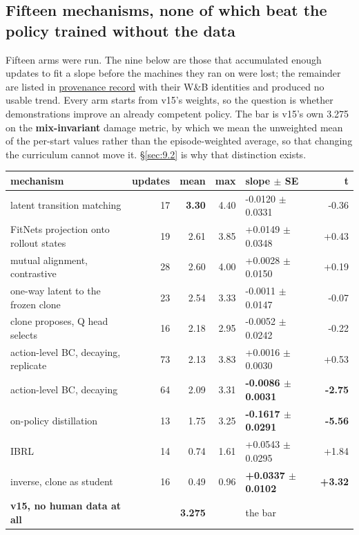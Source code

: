 \documentclass[11pt]{article}
\begin{document}
\subsection{Fifteen mechanisms, none of which beat the policy trained without the data}
\label{sec:6.3}

Fifteen arms were run. The nine below are those that accumulated enough updates to fit a slope before the machines they ran on were lost; the remainder are listed in \href{https://github.com/JordyKieto/ppo-hyrule/blob/main/PROVENANCE.md}{provenance record} with their W\&B identities and produced no usable trend. Every arm starts from v15's weights, so the question is whether demonstrations improve an already competent policy. The bar is v15's own 3.275 on the \textbf{mix-invariant} damage metric, by which we mean the unweighted mean of the per-start values rather than the episode-weighted average, so that changing the curriculum cannot move it. \S\ref{sec:9.2} is why that distinction exists.

\begin{table}[!htbp]
  \centering
  \label{tab:fifteenmechanismsforfolding1}
\begin{center}\small
\begin{tabularx}{\linewidth}{@{}XrrrXr@{}}
\toprule
\textbf{mechanism} & \textbf{updates} & \textbf{mean} & \textbf{max} & \textbf{slope $\pm$ SE} & \textbf{t} \\
\midrule
latent transition matching & 17 & \textbf{3.30} & 4.40 & -0.0120 $\pm$ 0.0331 & -0.36 \\
FitNets projection onto rollout states & 19 & 2.61 & 3.85 & +0.0149 $\pm$ 0.0348 & +0.43 \\
mutual alignment, contrastive & 28 & 2.60 & 4.00 & +0.0028 $\pm$ 0.0150 & +0.19 \\
one-way latent to the frozen clone & 23 & 2.54 & 3.33 & -0.0011 $\pm$ 0.0147 & -0.07 \\
clone proposes, Q head selects & 16 & 2.18 & 2.95 & -0.0052 $\pm$ 0.0242 & -0.22 \\
action-level BC, decaying, replicate & 73 & 2.13 & 3.83 & +0.0016 $\pm$ 0.0030 & +0.53 \\
action-level BC, decaying & 64 & 2.09 & 3.31 & \textbf{-0.0086 $\pm$ 0.0031} & \textbf{-2.75} \\
on-policy distillation & 13 & 1.75 & 3.25 & \textbf{-0.1617 $\pm$ 0.0291} & \textbf{-5.56} \\
IBRL & 14 & 0.74 & 1.61 & +0.0543 $\pm$ 0.0295 & +1.84 \\
inverse, clone as student & 16 & 0.49 & 0.96 & \textbf{+0.0337 $\pm$ 0.0102} & \textbf{+3.32} \\
\textbf{v15, no human data at all} &  & \textbf{3.275} &  & the bar &  \\
\bottomrule
\end{tabularx}
\end{center}
\end{table}
\end{document}
